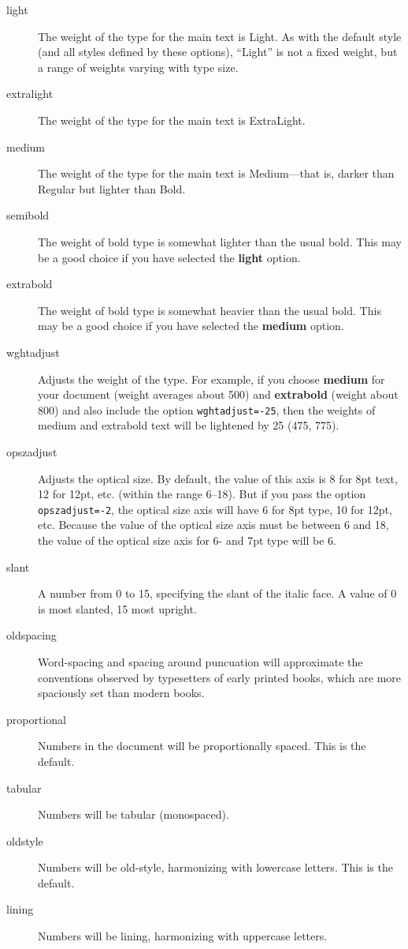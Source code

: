 \documentclass[12pt]{article}
\begin{document}
\begin{description}
    \item[light] The weight of the type for the main text is Light. As with the default
    style (and all styles defined by these options), “Light” is not a fixed weight, but
    a range of weights varying with type size.
    \item[extralight] The weight of the type for the main text is ExtraLight.
    \item[medium] The weight of the type for the main text is Medium---that is, darker than
    Regular but lighter than Bold.
    \item[semibold] The weight of bold type is somewhat lighter than the usual bold. This may be a
    good choice if you have selected the \textbf{light} option.
    \item[extrabold] The weight of bold type is somewhat heavier than the usual bold. This may be a
    good choice if you have selected the \textbf{medium} option.
    \item[wghtadjust] Adjusts the weight of the type. For example, if you choose \textbf{medium}
    for your document (weight averages about 500) and \textbf{extrabold} (weight about 800)
    and also include the option {\color{BrickRed}\verb|wghtadjust=-25|}, then the weights of medium and extrabold
    text will be lightened by 25 (475, 775).
    \item[opszadjust] Adjusts the optical size. By default, the value of this axis
    is 8 for 8pt text, 12 for 12pt, etc. (within the range 6–18). But if you pass the
    option {\color{BrickRed}\verb|opszadjust=-2|}, the optical size axis will have 6 for 8pt type, 10 for
    12pt, etc. Because the value of the optical size axis must be between 6 and 18, the
    value of the optical size axis for 6- and 7pt type will be 6.
    \item[slant] A number from 0 to 15, specifying the slant of the italic face.
    A value of 0 is {\mostslanted most slanted}, 15 {\leastslanted most upright}.
    \item[oldspacing] Word-spacing and spacing around puncuation will approximate the conventions
    observed by typesetters of early printed books, which are more spaciously set than
    modern books.
    \item[proportional] Numbers in the document will be proportionally spaced. This is the default.
    \item[tabular] Numbers will be tabular (monospaced).
    \item[oldstyle] Numbers will be old-style, harmonizing with lowercase letters. This is the default.
    \item[lining] Numbers will be lining, harmonizing with uppercase letters.
\end{description}
\end{document}

